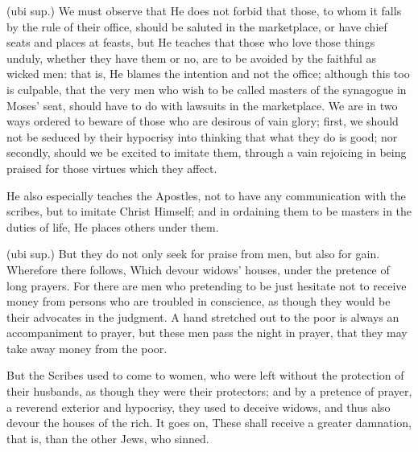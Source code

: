  (ubi sup.) We must observe that He does not forbid that those, to whom it falls by the rule of their office, should be saluted in the marketplace, or have chief seats and places at feasts, but He teaches that those who love those things unduly, whether they have them or no, are to be avoided by the faithful as wicked men: that is, He blames the intention and not the office; although this too is culpable, that the very men who wish to be called masters of the synagogue in Moses’ seat, should have to do with lawsuits in the marketplace. We are in two ways ordered to beware of those who are desirous of vain glory; first, we should not be seduced by their hypocrisy into thinking that what they do is good; nor secondly, should we be excited to imitate them, through a vain rejoicing in being praised for those virtues which they affect.

 He also especially teaches the Apostles, not to have any communication with the scribes, but to imitate Christ Himself; and in ordaining them to be masters in the duties of life, He places others under them.

 (ubi sup.) But they do not only seek for praise from men, but also for gain. Wherefore there follows, Which devour widows’ houses, under the pretence of long prayers. For there are men who pretending to be just hesitate not to receive money from persons who are troubled in conscience, as though they would be their advocates in the judgment. A hand stretched out to the poor is always an accompaniment to prayer, but these men pass the night in prayer, that they may take away money from the poor.

 But the Scribes used to come to women, who were left without the protection of their husbands, as though they were their protectors; and by a pretence of prayer, a reverend exterior and hypocrisy, they used to deceive widows, and thus also devour the houses of the rich. It goes on, These shall receive a greater damnation, that is, than the other Jews, who sinned.

 

